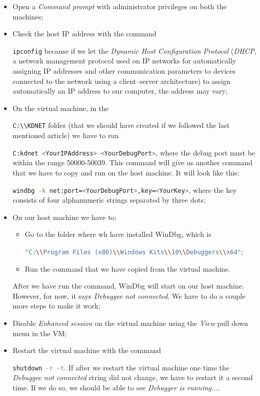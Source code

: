 \begin{itemize}
	\item 
		Open a \textit{Command prompt} with administrator privileges on both the machines;
	\item 
		Check the host IP address with the command \raggedright\colorbox{backcolour}{\lstinline[style=commandline, language=bash]|ipconfig|} because if we let the \textit{Dynamic Host Configuration Protocol} (\textit{DHCP}, a network management protocol used on IP networks for automatically assigning IP addresses and other communication parameters to devices connected to the network using a client–server architecture) to assign automatically an IP address to our computer, the address may vary;
	\item 
		On the virtual machine, in the \raggedright\colorbox{backcolour}{\lstinline[style=commandline, language=bash]|C:\\KDNET|} folder (that we should have created if we followed the last mentioned article) we have to run \raggedright\colorbox{backcolour}{\lstinline[style=commandline, language=bash]|C:kdnet <YourIPAddress> <YourDebugPort>|}, where the debug port must be within the range 50000-50039.
		This command will give us another command that we have to copy and run on the host machine.
		It will look like this: \raggedright\colorbox{backcolour}{\lstinline[style=commandline, language=bash]|windbg -k net:port=<YourDebugPort>,key=<YourKey>|}, where the key consists of four alphanumeric strings separated by three dots;
	\item 
		On our host machine we have to:
		\begin{itemize}
			\item 
				Go to the folder where wh have installed WinDbg, which is \raggedright\colorbox{backcolour}{\lstinline[style=commandline, language=bash]|"C:\\Program Files (x86)\\Windows Kits\\10\\Debuggers\\x64"|};
			\item 
				Run the command that we have copied from the virtual machine.
		\end{itemize}
		After we have run the command, WinDbg will start on our host machine.
		However, for now, it says \textit{Debuggee not connected}.
		We have to do a couple more steps to make it work;
	\item 
		Disable \textit{Enhanced session} on the virtual machine using the \textit{View} pull down menu in the VM;
	\item 
		Restart the virtual machine with the command \raggedright\colorbox{backcolour}{\lstinline[style=commandline, language=bash]|shutdown -r -t|}.
		If after we restart the virtual machine one time the \textit{Debuggee not connected} string did not change, we have to restart it a second time.
		If we do so, we should be able to see \textit{Debugger is running...}.
\end{itemize}


